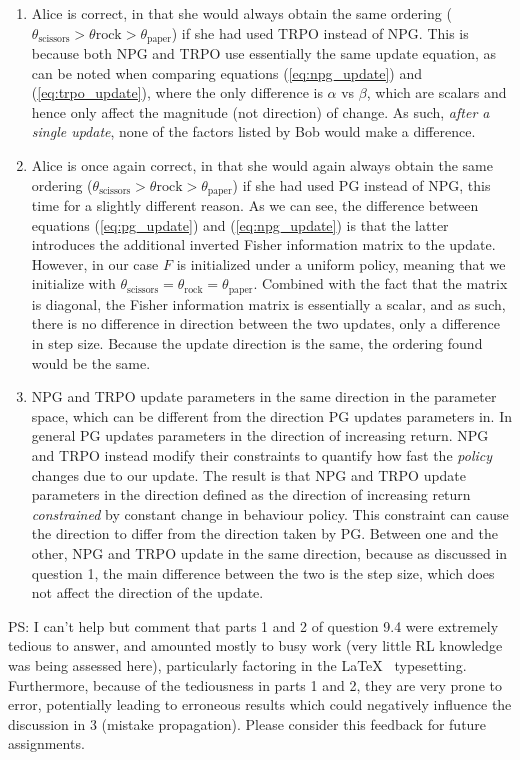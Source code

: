\documentclass{article}
\begin{document}
\begin{enumerate}
	\item Alice is correct, in that she would always obtain the same ordering
	      ($\theta_{\text{scissors}} > \theta{\text{rock}} > \theta_{\text{paper}}$) if she had used TRPO
	      instead of NPG. This is because both NPG and TRPO use essentially the same update equation, as
	      can be noted when comparing equations (\ref{eq:npg_update}) and (\ref{eq:trpo_update}), where
	      the only difference is $\alpha$ vs $\beta$, which are scalars and hence only affect the
	      magnitude (not direction) of change. As such, \textit{after a single update}, none of the
	      factors listed by Bob would make a difference.
	\item Alice is once again correct, in that she would again always obtain the same ordering
	      ($\theta_{\text{scissors}} > \theta{\text{rock}} > \theta_{\text{paper}}$) if she had used PG
	      instead of NPG, this time for a slightly different reason. As we can see, the difference between
	      equations (\ref{eq:pg_update}) and (\ref{eq:npg_update}) is that the latter introduces the
	      additional inverted Fisher information matrix to the update. However, in our case $F$ is
	      initialized under a uniform policy, meaning that we initialize with $\theta_{\text{scissors}}
		      = \theta_{\text{rock}} = \theta_{\text{paper}}$. Combined with the fact that the matrix is
	      diagonal, the Fisher information matrix is essentially a scalar, and as such, there is no
	      difference in direction between the two updates, only a difference in step size. Because the
	      update direction is the same, the ordering found would be the same.
	\item NPG and TRPO update parameters in the same direction in the parameter space, which can be
	      different from the direction PG updates parameters in. In general PG updates parameters in the
	      direction of increasing return. NPG and TRPO instead modify their constraints to quantify how
	      fast the \textit{policy} changes due to our update. The result is that NPG and TRPO update
	      parameters in the direction defined as the direction of increasing return \textit{constrained}
	      by constant change in behaviour policy. This constraint can cause the direction to differ from
	      the direction taken by PG. Between one and the other, NPG and TRPO update in the same direction,
	      because as discussed in question 1, the main difference between the two is the step size, which
	      does not affect the direction of the update.
\end{enumerate}

\newpage

\vspace*{\fill}
PS: I can't help but comment that parts 1 and 2 of question 9.4 were extremely tedious to answer,
and amounted mostly to busy work (very little RL knowledge was being assessed here), particularly
factoring in the \LaTeX~ typesetting. Furthermore, because of the tediousness in parts 1 and 2, they
are very prone to error, potentially leading to erroneous results which could negatively influence
the discussion in 3 (mistake propagation). Please consider this feedback for future assignments.
\vspace*{\fill}
\end{document}
